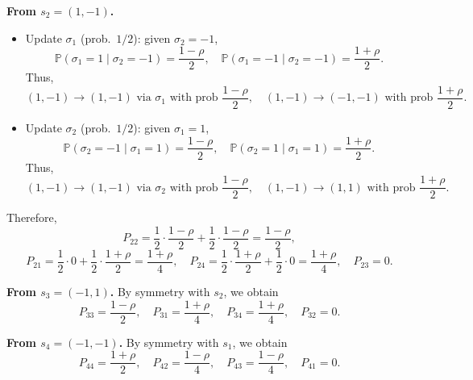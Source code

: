\documentclass[answers,12pt,addpoints]{exam}
\begin{document}
\begin{enumerate}
\begin{solution}
\medskip
\noindent\textbf{From $s_2=(1,-1)$.}
\begin{itemize}
    \item Update $\sigma_1$ (prob.\ $1/2$): given $\sigma_2=-1$,
    \[
    \mathbb{P}(\sigma_1=1\mid\sigma_2=-1)=\frac{1-\rho}{2},\quad
    \mathbb{P}(\sigma_1=-1\mid\sigma_2=-1)=\frac{1+\rho}{2}.
    \]
    Thus,
    \[
    (1,-1)\to(1,-1) \text{ via }\sigma_1 \text{ with prob } \frac{1-\rho}{2},\quad
    (1,-1)\to(-1,-1) \text{ with prob } \frac{1+\rho}{2}.
    \]
    \item Update $\sigma_2$ (prob.\ $1/2$): given $\sigma_1=1$,
    \[
    \mathbb{P}(\sigma_2=-1\mid\sigma_1=1)=\frac{1-\rho}{2},\quad
    \mathbb{P}(\sigma_2=1\mid\sigma_1=1)=\frac{1+\rho}{2}.
    \]
    Thus,
    \[
    (1,-1)\to(1,-1) \text{ via }\sigma_2 \text{ with prob } \frac{1-\rho}{2},\quad
    (1,-1)\to(1,1) \text{ with prob } \frac{1+\rho}{2}.
    \]
\end{itemize}
Therefore,
\[
P_{22} = \frac{1}{2}\cdot\frac{1-\rho}{2} + \frac{1}{2}\cdot\frac{1-\rho}{2}
= \frac{1-\rho}{2},
\]
\[
P_{21} = \frac{1}{2}\cdot 0 + \frac{1}{2}\cdot\frac{1+\rho}{2}
= \frac{1+\rho}{4},
\quad
P_{24} = \frac{1}{2}\cdot\frac{1+\rho}{2} + \frac{1}{2}\cdot 0
= \frac{1+\rho}{4},
\quad
P_{23} = 0.
\]

\medskip
\noindent\textbf{From $s_3=(-1,1)$.}
By symmetry with $s_2$, we obtain
\[
P_{33} = \frac{1-\rho}{2},\quad
P_{31} = \frac{1+\rho}{4},\quad
P_{34} = \frac{1+\rho}{4},\quad
P_{32} = 0.
\]

\medskip
\noindent\textbf{From $s_4=(-1,-1)$.}
By symmetry with $s_1$, we obtain
\[
P_{44} = \frac{1+\rho}{2},\quad
P_{42} = \frac{1-\rho}{4},\quad
P_{43} = \frac{1-\rho}{4},\quad
P_{41} = 0.
\]


\end{solution}
\end{enumerate}
\end{document}
